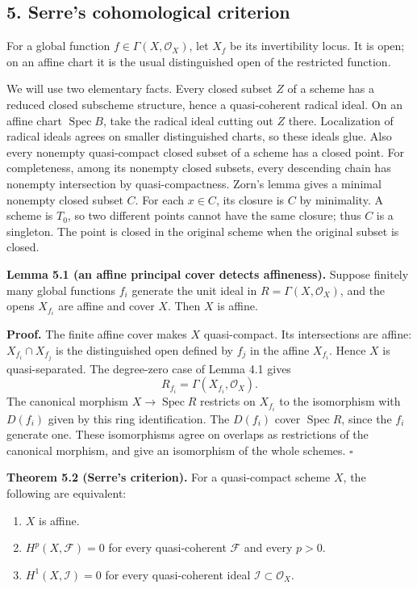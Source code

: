 \documentclass[11pt]{article}
\providecommand{\tightlist}{\setlength{\itemsep}{0pt}\setlength{\parskip}{0pt}}
\begin{document}
\subsection{5. Serre's cohomological
criterion}\label{serres-cohomological-criterion}

For a global function \(f\in\Gamma(X,\mathcal O_X)\), let \(X_f\) be its
invertibility locus. It is open; on an affine chart it is the usual
distinguished open of the restricted function.

We will use two elementary facts. Every closed subset \(Z\) of a scheme
has a reduced closed subscheme structure, hence a quasi-coherent radical
ideal. On an affine chart \(\operatorname{Spec}B\), take the radical
ideal cutting out \(Z\) there. Localization of radical ideals agrees on
smaller distinguished charts, so these ideals glue. Also every nonempty
quasi-compact closed subset of a scheme has a closed point. For
completeness, among its nonempty closed subsets, every descending chain
has nonempty intersection by quasi-compactness. Zorn's lemma gives a
minimal nonempty closed subset \(C\). For each \(x\in C\), its closure
is \(C\) by minimality. A scheme is \(T_0\), so two different points
cannot have the same closure; thus \(C\) is a singleton. The point is
closed in the original scheme when the original subset is closed.

\textbf{Lemma 5.1 (an affine principal cover detects affineness).}
Suppose finitely many global functions \(f_i\) generate the unit ideal
in \(R=\Gamma(X,\mathcal O_X)\), and the opens \(X_{f_i}\) are affine
and cover \(X\). Then \(X\) is affine.

\textbf{Proof.} The finite affine cover makes \(X\) quasi-compact. Its
intersections are affine: \(X_{f_i}\cap X_{f_j}\) is the distinguished
open defined by \(f_j\) in the affine \(X_{f_i}\). Hence \(X\) is
quasi-separated. The degree-zero case of Lemma 4.1 gives \[
R_{f_i}=\Gamma(X_{f_i},\mathcal O_X).
\] The canonical morphism \(X\to\operatorname{Spec}R\) restricts on
\(X_{f_i}\) to the isomorphism with \(D(f_i)\) given by this ring
identification. The \(D(f_i)\) cover \(\operatorname{Spec}R\), since the
\(f_i\) generate one. These isomorphisms agree on overlaps as
restrictions of the canonical morphism, and give an isomorphism of the
whole schemes. \(\square\)

\textbf{Theorem 5.2 (Serre's criterion).} For a quasi-compact scheme
\(X\), the following are equivalent:

\begin{enumerate}
\def\labelenumi{\arabic{enumi}.}
\tightlist
\item
  \(X\) is affine.
\item
  \(H^p(X,\mathcal F)=0\) for every quasi-coherent \(\mathcal F\) and
  every \(p>0\).
\item
  \(H^1(X,\mathcal I)=0\) for every quasi-coherent ideal
  \(\mathcal I\subset\mathcal O_X\).
\end{enumerate}
\end{document}
